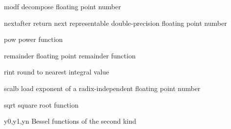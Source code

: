 \begin{csymlist}
\item[modf]
	decompose floating point number
\item[nextafter]
	return next representable double-precision floating point number
\item[pow]
	power function
\item[remainder]
	floating point remainder function
\item[rint]
	round to nearest integral value
\item[scalb]
	load exponent of a radix-independent floating point number
\item[sqrt]
	square root function
\item[y0,y1,yn]
	  
	Bessel functions of the second kind
\end{csymlist}
